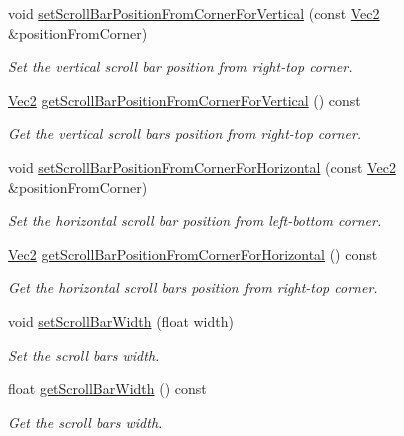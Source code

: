\begin{DoxyCompactItemize}
void \hyperlink{classui_1_1ScrollView_a651e4c42ddd0fad838342eabddd10ba9}{set\+Scroll\+Bar\+Position\+From\+Corner\+For\+Vertical} (const \hyperlink{classVec2}{Vec2} \&position\+From\+Corner)
\begin{DoxyCompactList}\small\item\em Set the vertical scroll bar position from right-\/top corner. \end{DoxyCompactList}\item 
\hyperlink{classVec2}{Vec2} \hyperlink{classui_1_1ScrollView_ae0e198b5b9ee2fd086f1b84a08db3e29}{get\+Scroll\+Bar\+Position\+From\+Corner\+For\+Vertical} () const
\begin{DoxyCompactList}\small\item\em Get the vertical scroll bar\textquotesingle{}s position from right-\/top corner. \end{DoxyCompactList}\item 
void \hyperlink{classui_1_1ScrollView_a90be948f12e37abc74892a7446aabb1a}{set\+Scroll\+Bar\+Position\+From\+Corner\+For\+Horizontal} (const \hyperlink{classVec2}{Vec2} \&position\+From\+Corner)
\begin{DoxyCompactList}\small\item\em Set the horizontal scroll bar position from left-\/bottom corner. \end{DoxyCompactList}\item 
\hyperlink{classVec2}{Vec2} \hyperlink{classui_1_1ScrollView_aeb1fb4b7f9eb9d8ef33359297a1d5284}{get\+Scroll\+Bar\+Position\+From\+Corner\+For\+Horizontal} () const
\begin{DoxyCompactList}\small\item\em Get the horizontal scroll bar\textquotesingle{}s position from right-\/top corner. \end{DoxyCompactList}\item 
void \hyperlink{classui_1_1ScrollView_a054ab40fea1eca71a27b4e68286907dc}{set\+Scroll\+Bar\+Width} (float width)
\begin{DoxyCompactList}\small\item\em Set the scroll bar\textquotesingle{}s width. \end{DoxyCompactList}\item 
float \hyperlink{classui_1_1ScrollView_ab01395ff7e8d6d108939361624766408}{get\+Scroll\+Bar\+Width} () const
\begin{DoxyCompactList}\small\item\em Get the scroll bar\textquotesingle{}s width. \end{DoxyCompactList}\item 

\end{DoxyCompactItemize}
